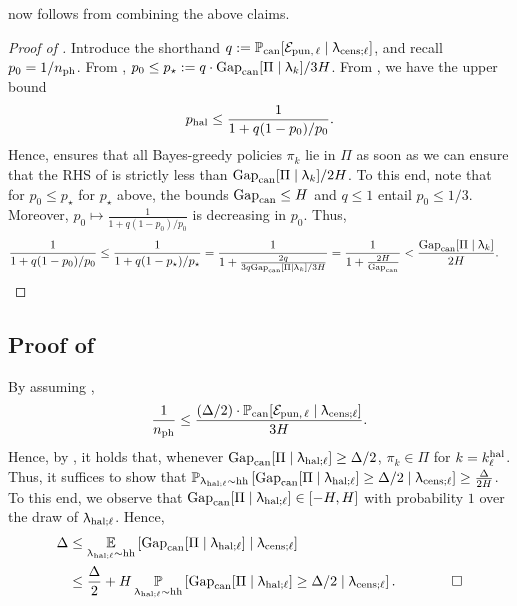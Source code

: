  now follows from combining the above claims.
\begin{proof}[Proof of ]
Introduce the shorthand $q:= \operatorname{\mathbb{P}}_{\mathrm{can}}[ \mathcal{E}_{\mathrm{pun},\,\ell} \mid \uplambda_{\mathrm{cens};\ell}]$, and recall $p_0 = 1/n_{\mathrm{ph}}$. From , $p_0 \le p_{\star} := q \cdot \mathrm{Gap}_{\mathrm{can}}[\Pi \mid \uplambda_k]/3H$.  From , we have the upper bound
\begin{align}
p_{\mathrm{hal}} \le \frac{1}{1 + q(1-p_0)/p_0} \label{eq:phal_fin_bound}.
\end{align}
Hence,  ensures that all Bayes-greedy policies $\pi_k$ lie in $\Pi$ as soon as we can ensure that the RHS of  is strictly less than $\mathrm{Gap}_{\mathrm{can}}[\Pi \mid \uplambda_k]/2H$. To this end, note that for $p_0 \le p_{\star}$ for $p_{\star}$ above, the bounds $\mathrm{Gap}_{\mathrm{can}} \le H$ and $q \le 1$ entail $p_0 \le 1/3$. Moreover, $p_0 \mapsto \frac{1}{1 + q(1-p_0)/p_0}$ is decreasing in $p_0$. Thus,
\begin{align*}
\frac{1}{1 + q(1-p_0)/p_0} \le \frac{1}{1 + q(1-p_\star)/p_\star} = \frac{1}{1 + \frac{2q}{3 q  \mathrm{Gap}_{\mathrm{can}}[\Pi \mid \uplambda_k]/3H}} = \frac{1}{1 + \frac{2H}{\mathrm{Gap}_{\mathrm{can}}}} < \frac{\mathrm{Gap}_{\mathrm{can}}[\Pi \mid \uplambda_k]}{2H}. \quad\qedhere
\end{align*}
\end{proof}




\subsection{Proof of }
By assuming ,
\begin{align*}
\frac{1}{n_{\mathrm{ph}}} \le \frac{(\Delta/2) \cdot \operatorname{\mathbb{P}}_{\mathrm{can}}[ \mathcal{E}_{\mathrm{pun},\,\ell} \mid \uplambda_{\mathrm{cens};\ell}]}{3H}.
\end{align*}
Hence, by , it holds that, whenever $\mathrm{Gap}_{\mathrm{can}}[\Pi \mid \uplambda_{\mathrm{hal};\ell}] \ge \Delta/2$, $\pi_k \in \Pi$ for $k = k^{\mathrm{hal}}_{\ell}$. Thus, it suffices to show that  $\Prsimhh\left[\gapcan[\Pi \mid \ledhall] \ge \Delta/2 \mid \ledcensl\right] \ge \frac{\Delta}{2H}$. To this end, we observe that $\mathrm{Gap}_{\mathrm{can}}[\Pi \mid \uplambda_{\mathrm{hal};\ell}] \in [-H,H]$ with probability $1$ over the draw of $\uplambda_{\mathrm{hal};\ell}$. Hence,
\begin{align*}
\Delta &\le \Expsimhh\left[\gapcan[\Pi \mid \ledhall] \mid \ledcensl\right]\\
&\le \frac{\Delta}{2} +  H \Prsimhh\left[\gapcan[\Pi \mid \ledhall] \ge \Delta/2 \mid \ledcensl\right]. \qquad\qed
\end{align*}


